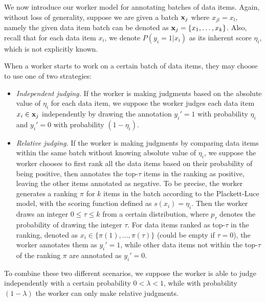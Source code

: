 %

We now introduce our worker model for annotating batches of data items.
Again, without loss of generality, suppose we are given a batch ${\mathbf{x}}_j$ where $x_{jl} = x_l$,
namely the given data item batch can be denoted as ${\mathbf{x}}_j=\{x_1, \ldots, x_k\}$.
Also, recall that for each data item $x_i$, we denote $P(y_i = 1 | x_i)$ as its inherent score $\eta_i$,
which is not explicitly known. 

When a worker starts to work on a certain batch of data items,
they may choose to use one of two strategies:
\begin{itemize}
  \item \emph{Independent judging.}
  If the worker is making judgments based on the absolute value of $\eta_i$ for each data item, 
  we suppose the worker judges each data item $x_i \in {\mathbf{x}}_j$ independently
  by drawing the annotation $y_i'=1$ with probability $\eta_i$ and $y_i' = 0$ with probability $(1 - \eta_i)$.
  \item \emph{Relative judging.}
  If the worker is making judgments by comparing data items within the same batch
  without knowing absolute value of $\eta_i$,
  we suppose the worker chooses to first rank all the data items based on their probability of being positive,
  then annotates the top-$\tau$ items in the ranking as positive, leaving the other items annotated as negative.
  To be precise, the worker generates a ranking $\pi$ for $k$ items in the batch according to the Plackett-Luce model,
  with the scoring function defined as $s(x_i) = \eta_i$.
  Then the worker draws an integer $0 \leq \tau \leq k$ from a certain distribution,
  where $p_\tau$ denotes the probability of drawing the integer $\tau$.
  For data items ranked as top-$\tau$ in the ranking,
  denoted as $x_i \in \{\pi(1), \ldots, \pi(\tau)\}$ (could be empty if $\tau = 0$),
  the worker annotates them as $y_i'=1$,
  while other data items not within the top-$\tau$ of the ranking $\pi$ are annotated as $y_i' = 0$.
\end{itemize}
To combine these two different scenarios,
we suppose the worker is able to judge independently with a certain probability $0 < \lambda < 1$,
while with probability $(1-\lambda)$ the worker can only make relative judgments.

